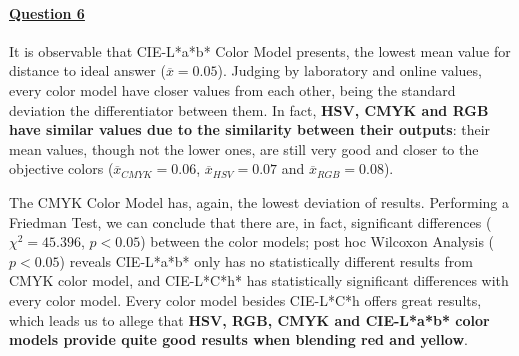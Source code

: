 \paragraph{\ul{Question 6}}
%
It is observable that CIE-L*a*b* Color Model presents, the lowest mean value for distance to ideal answer ($\overline{x} = 0.05$).
Judging by laboratory and online values, every color model have closer values from each other, being the standard deviation the differentiator between them. In fact, \textbf{HSV, CMYK and RGB have similar values due to the similarity between their outputs}: their mean values, though not
the lower ones, are still very good and closer to the objective colors ($\overline{x}_{CMYK} = 0.06$, $\overline{x}_{HSV} = 0.07$ and $\overline{x}_{RGB} = 0.08$). \par
%
The CMYK Color Model has, again, the lowest deviation of results. Performing a Friedman Test, we can conclude that there are, in fact, significant differences ($\chi^2 = 45.396$, $p < 0.05$)
between the color models; post hoc Wilcoxon Analysis ($p < 0.05$) reveals CIE-L*a*b* only has no statistically different results from CMYK color model, and CIE-L*C*h* has statistically
significant differences with every color model. Every color model besides CIE-L*C*h offers great results, which leads us to allege that \textbf{HSV, RGB, CMYK and CIE-L*a*b* color models
provide quite good results when blending red and yellow}.
%
